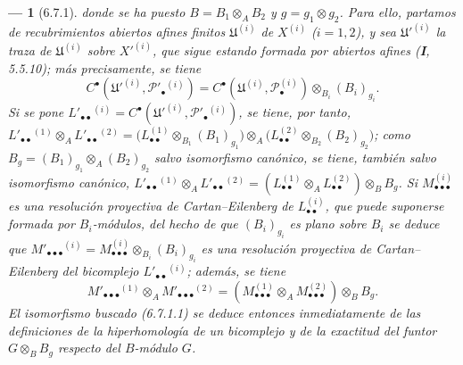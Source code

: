 \documentclass[10pt,oneside,openany]{book}
\theoremstyle{egaenv}\newtheorem*{env}{---}
\theoremstyle{egastatement}
\theoremstyle{egadescription}
\begin{document}
\begin{env}[6.7.1]
donde se ha puesto $B=B_1\otimes_A B_2$ y $g=g_1\otimes g_2$. Para ello,
partamos de recubrimientos abiertos afines finitos $\mathfrak U^{(i)}$ de
$X^{(i)}$ ($i=1,2$), y sea $\mathfrak U'^{(i)}$ la traza de
$\mathfrak U^{(i)}$ sobre $X'^{(i)}$, que sigue estando formada por abiertos
afines (\textbf I, 5.5.10); más precisamente, se tiene
\[
  C^\bullet(\mathfrak U'^{(i)},\mathscr P'_\bullet{}^{(i)})
  =C^\bullet(\mathfrak U^{(i)},\mathscr P_\bullet^{(i)})
   \otimes_{B_i}(B_i)_{g_i}.
\]
Si se pone
$L'_{\bullet\bullet}{}^{(i)}
=C^\bullet(\mathfrak U'^{(i)},\mathscr P'_\bullet{}^{(i)})$, se tiene, por
tanto,
$
  L'_{\bullet\bullet}{}^{(1)}\otimes_A L'_{\bullet\bullet}{}^{(2)}
  =\bigl(L_{\bullet\bullet}^{(1)}\otimes_{B_1}(B_1)_{g_1}\bigr)
   \otimes_A
   \bigl(L_{\bullet\bullet}^{(2)}\otimes_{B_2}(B_2)_{g_2}\bigr)$;
como $B_g=(B_1)_{g_1}\otimes_A(B_2)_{g_2}$ salvo isomorfismo canónico, se
tiene, también salvo isomorfismo canónico,
$
  L'_{\bullet\bullet}{}^{(1)}\otimes_A L'_{\bullet\bullet}{}^{(2)}
  =(L_{\bullet\bullet}^{(1)}\otimes_A L_{\bullet\bullet}^{(2)})
    \otimes_B B_g$.
Si $M_{\bullet\bullet\bullet}^{(i)}$ es una resolución proyectiva de
Cartan--Eilenberg de $L_{\bullet\bullet}^{(i)}$, que puede suponerse formada
por $B_i$-módulos, del hecho de que $(B_i)_{g_i}$ es \emph{plano} sobre $B_i$
se deduce que
$M'_{\bullet\bullet\bullet}{}^{(i)}
=M_{\bullet\bullet\bullet}^{(i)}\otimes_{B_i}(B_i)_{g_i}$ es una resolución
proyectiva de Cartan--Eilenberg del bicomplejo
$L'_{\bullet\bullet}{}^{(i)}$; además, se tiene
\[
  M'_{\bullet\bullet\bullet}{}^{(1)}\otimes_A M'_{\bullet\bullet\bullet}{}^{(2)}
  =(M_{\bullet\bullet\bullet}^{(1)}\otimes_A M_{\bullet\bullet\bullet}^{(2)})
    \otimes_B B_g.
\]
El isomorfismo buscado (6.7.1.1) se deduce entonces inmediatamente de las
definiciones de la hiperhomología de un bicomplejo y de la exactitud del
funtor $G\otimes_B B_g$ respecto del $B$-módulo $G$.
\end{env}
\end{document}
